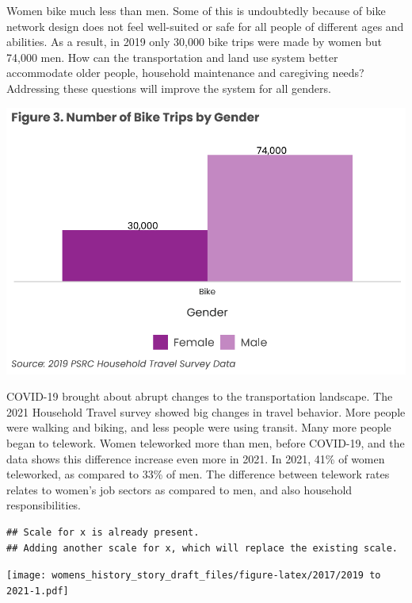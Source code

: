 \documentclass[
  12pt,
]{article}
\begin{document}
\begin{flushleft}
Women bike much less than men. Some of this is undoubtedly because of bike network design does not feel well-suited or safe for all people of different ages and abilities. As a result, in 2019 only 30,000 bike trips were made by women but 74,000 men. How can the transportation and land use system better accommodate older people, household maintenance and caregiving needs? Addressing these questions will improve the system for all genders.
\end{flushleft}

\includegraphics{womens_history_story_draft_files/figure-latex/Bike trips-1.pdf}

\begin{flushleft}
COVID-19 brought about abrupt changes to the transportation landscape. The 2021 Household Travel survey showed big changes in travel behavior. More people were walking and biking, and less people were using transit. Many more people began to telework. Women teleworked more than men, before COVID-19, and the data shows this difference increase even more in 2021. In 2021, 41\% of women teleworked, as compared to 33\% of men. The difference between telework rates relates to women's job sectors as compared to men, and also household responsibilities.
\end{flushleft}

\begin{verbatim}
## Scale for x is already present.
## Adding another scale for x, which will replace the existing scale.
\end{verbatim}

\texttt{[image: womens\_history\_story\_draft\_files/figure-latex/2017/2019 to 2021-1.pdf]}
\end{document}
